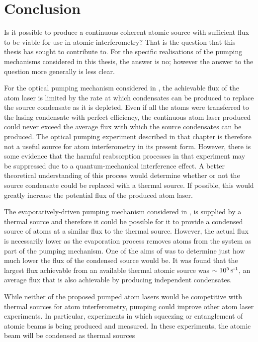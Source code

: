 \chapter{Conclusion}
\label{Conclusion}
\graphicspath{{Figures/Conclusion/}{Figures/Common/}}

Is it possible to produce a continuous coherent atomic source with sufficient flux to be viable for use in atomic interferometry?  That is the question that this thesis has sought to contribute to.  For the specific realisations of the pumping mechanisms considered in this thesis, the answer is no; however the answer to the question more generally is less clear.  

For the optical pumping mechanism considered in , the achievable flux of the atom laser is limited by the rate at which condensates can be produced to replace the source condensate as it is depleted.  Even if all the atoms were transferred to the lasing condensate with perfect efficiency, the continuous atom laser produced could never exceed the average flux with which the source condensates can be produced.  The optical pumping experiment described in that chapter is therefore not a useful source for atom interferometry in its present form.  However, there is some evidence that the harmful reabsorption processes in that experiment may be suppressed due to a quantum-mechanical interference effect.  A better theoretical understanding of this process would determine whether or not the source condensate could be replaced with a thermal source.  If possible, this would greatly increase the potential flux of the produced atom laser.

The evaporatively-driven pumping mechanism considered in , is supplied by a thermal source and therefore it could be possible for it to provide a condensed source of atoms at a similar flux to the thermal source.  However, the actual flux is necessarily lower as the evaporation process removes atoms from the system as part of the pumping mechanism.  One of the aims of  was to determine just how much lower the flux of the condensed source would be.  It was found that the largest flux achievable from an available thermal atomic source was $\sim\unit[10^5]{s\textsuperscript{-1}}$, an average flux that is also achievable by producing independent condensates.

While neither of the proposed pumped atom lasers would be competitive with thermal sources for atom interferometry, pumping could improve other atom laser experiments.  In particular, experiments in which squeezing or entanglement of atomic beams is being produced and measured.  In these experiments, the atomic beam will be condensed as thermal sources 

